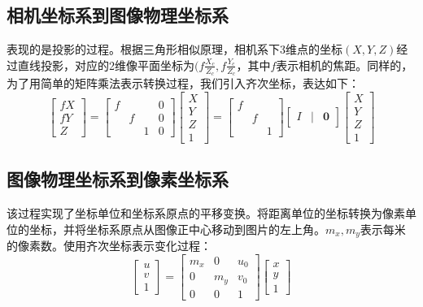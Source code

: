 \documentclass[10pt,a4paper]{article}
\begin{document}
\begin{CJK*}{UTF8}{gbsn}
\subsection{相机坐标系到图像物理坐标系}
表现的是投影的过程。根据三角形相似原理，相机系下3维点的坐标$(X,Y,Z)$经过直线投影，对应的2维像平面坐标为$(f\frac{X_c}{Z_c}, f\frac{Y_c}{Z_c}$，其中$f$表示相机的焦距。同样的，为了用简单的矩阵乘法表示转换过程，我们引入齐次坐标，表达如下：
\begin{equation}
\label{eq:in1}
\begin{bmatrix}
fX \\ fY \\ Z
\end{bmatrix} = 
\begin{bmatrix}
f &   &   & 0 \\
  & f &   & 0 \\
  &   & 1 & 0
\end{bmatrix} \begin{bmatrix} X \\ Y \\ Z \\ 1 \end{bmatrix}
=
\begin{bmatrix}
f &   &   \\
  & f &   \\
  &   & 1
\end{bmatrix} \begin{bmatrix}  I & | & \mathbf{0}\end{bmatrix} \begin{bmatrix} X \\ Y \\ Z \\ 1 \end{bmatrix}
\end{equation}

\subsection{图像物理坐标系到像素坐标系}
该过程实现了坐标单位和坐标系原点的平移变换。将距离单位的坐标转换为像素单位的坐标，并将坐标系原点从图像正中心移动到图片的左上角。$m_x, m_y$表示每米的像素数。使用齐次坐标表示变化过程：
\begin{equation}
\begin{bmatrix}
u \\ v \\ 1
\end{bmatrix}=
\begin{bmatrix}
m_x & 0 & u_0 \\
0 & m_y & v_0 \\
0 & 0 & 1
\end{bmatrix} \begin{bmatrix} x \\ y \\ 1 \end{bmatrix}
\label{eq:in2}
\end{equation}


\end{CJK*}
\end{document}
